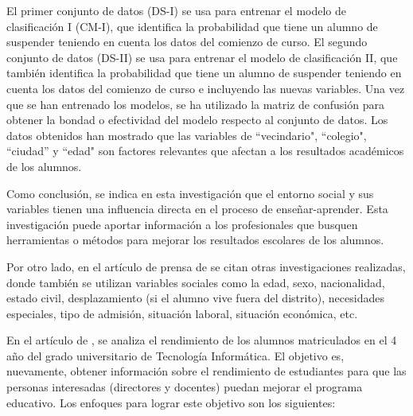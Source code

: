 El primer conjunto de datos (DS-I) se usa para entrenar el modelo de clasificación I (CM-I), que identifica la probabilidad que tiene un alumno de suspender teniendo en cuenta los datos del comienzo de curso. El segundo conjunto de datos (DS-II) se usa para entrenar el modelo de clasificación II, que también identifica la probabilidad que tiene un alumno de suspender teniendo en cuenta los datos del comienzo de curso e incluyendo las nuevas variables. Una vez que se han entrenado los modelos, se ha utilizado la matriz de confusión para obtener la bondad o efectividad del modelo respecto al conjunto de datos. Los datos obtenidos han mostrado que las variables de ``vecindario", ``colegio", ``ciudad'' y ``edad" son factores relevantes que afectan a los resultados académicos de los alumnos.

Como conclusión, se indica en esta investigación que el entorno social y sus variables tienen una influencia directa en el proceso de enseñar-aprender. Esta investigación puede aportar información a los profesionales que busquen herramientas o métodos para mejorar los resultados escolares de los alumnos.

Por otro lado, en el artículo de prensa de  se citan otras investigaciones realizadas, donde también se utilizan variables sociales como la edad, sexo, nacionalidad, estado civil, desplazamiento (si el alumno vive fuera del distrito), necesidades especiales, tipo de admisión, situación laboral, situación económica, etc.

En el artículo de , se analiza el rendimiento de los alumnos matriculados en el 4 año del grado universitario de Tecnología Informática. El objetivo es, nuevamente, obtener información sobre el rendimiento de estudiantes para que las personas interesadas (directores y docentes) puedan mejorar el programa educativo. Los enfoques para lograr este objetivo son los siguientes:

